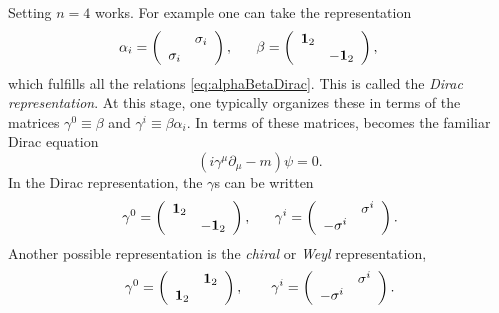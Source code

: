 Setting $n=4$ works. For example one can take the representation
\begin{equation}
\alpha_i
  =\left(\begin{array}{cc}
       &  \sigma_i       \\ 
      \sigma_i  & 
    \end{array}\right),~~~~~
\beta
  =\left(\begin{array}{cc}
       {\mathbf 1}_2& \\ 
        &-{\mathbf 1}_2 
    \end{array}\right),~~~~~
\end{equation} 
which fulfills all the relations \eqref{eq:alphaBetaDirac}. This is
called the {\it Dirac
representation}. 
At this stage,
one typically organizes these in terms of the matrices
$\gamma^0\equiv\beta$ and $\gamma^i\equiv\beta\alpha_i$. In terms of these
matrices,  becomes the familiar Dirac equation
\begin{equation}
\left(i\gamma^\mu\partial_\mu-m\right)\psi=0.
\end{equation}
In the Dirac representation, the $\gamma$s can be written 
\begin{equation}
\gamma^0
  =\left(\begin{array}{cc}
       {\mathbf 1}_2& \\ 
        &-{\mathbf 1}_2 
    \end{array}\right),~~~~~
\gamma^i
  =\left(\begin{array}{cc}
       &  \sigma^i       \\ 
      -\sigma^i  & 
    \end{array}\right).
\end{equation} 
Another possible representation is
the {\it chiral} 
or {\it Weyl} representation,
\begin{equation}
  \gamma^0=\left(\begin{array}{cc}
                        & {\mathbf 1}_2    \\
                 {\mathbf 1}_2  &  
           \end{array}\right), \qquad
  \gamma^i=\left(\begin{array}{cc}
                           & \sigma^i \\
                 -\sigma^i &  
           \end{array}\right).
\end{equation}

